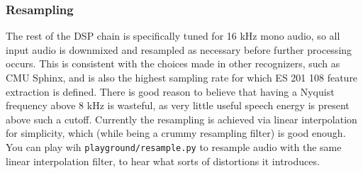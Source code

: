 \documentclass{article}
\begin{document}
\subsubsection{Resampling}
The rest of the DSP chain is specifically tuned for 16 kHz mono audio, so all input audio is downmixed and resampled as necessary before further processing occurs.
This is consistent with the choices made in other recognizers, such as CMU Sphinx, and is also the highest sampling rate for which ES 201 108 feature extraction is defined.
There is good reason to believe that having a Nyquist frequency above 8 kHz is wasteful, as very little useful speech energy is present above such a cutoff.
Currently the resampling is achieved via linear interpolation for simplicity, which (while being a crummy resampling filter) is good enough.
You can play wih \texttt{playground/resample.py} to resample audio with the same linear interpolation filter, to hear what sorts of distortions it introduces.
\end{document}
